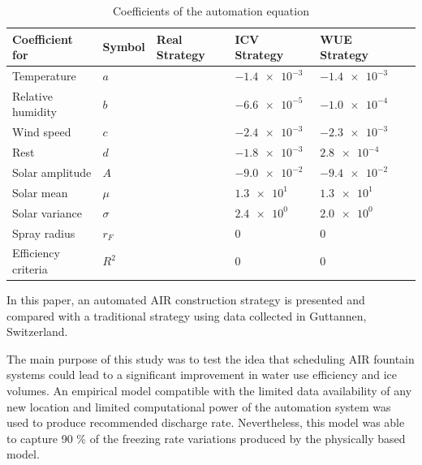 \documentclass[tc, manuscript]{copernicus}
\begin{document}
\begin{table}[]
\centering
\caption{Coefficients of the automation equation}
\label{tab:assumptions}
\begin{tabular}{@{}llllll@{}}
\toprule
\textbf{Coefficient for} & \textbf{Symbol} & \textbf{Real Strategy} & \textbf{ICV Strategy} & \textbf{WUE Strategy} & \\ \midrule
\multicolumn{1}{|l}{Temperature}       &$a$  & & $\num{-1.4 e-3}$ & $\num{-1.4 e-3}$ & \multicolumn{1}{l|}{} \\ \midrule
\multicolumn{1}{|l}{Relative humidity}      &$b$  & & $\num{-6.6 e-5}$ & $\num{-1.0 e-4}$ & \multicolumn{1}{l|}{} \\ \midrule
\multicolumn{1}{|l}{Wind speed}      &$c$  & & $\num{-2.4 e-3}$ & $\num{-2.3 e-3}$ & \multicolumn{1}{l|}{} \\ \midrule
\multicolumn{1}{|l}{Rest}      &$d$  & & $\num{-1.8 e-3}$ & $\num{2.8 e-4}$ & \multicolumn{1}{l|}{} \\ \midrule
\multicolumn{1}{|l}{Solar amplitude}      &$A$  & & $\num{-9.0 e-2}$ & $\num{-9.4 e-2}$ & \multicolumn{1}{l|}{} \\ \midrule
\multicolumn{1}{|l}{Solar mean}    &$\mu$  & & $\num{1.3 e+1}$  & $\num{1.3 e+1}$ & \multicolumn{1}{l|}{} \\ \midrule
\multicolumn{1}{|l}{Solar variance} &$\sigma$  & & $\num{2.4 e+0}$  & $\num{2.0 e+0}$ & \multicolumn{1}{l|}{} \\ \midrule
\multicolumn{1}{|l}{Spray radius} &$r_F$ & & 0 & 0 & \multicolumn{1}{l|}{} \\ \bottomrule
\multicolumn{1}{|l}{Efficiency criteria} &$R^2$ & & 0 & 0 & \multicolumn{1}{l|}{} \\ \bottomrule
\end{tabular}
\end{table}


\conclusions
In this paper, an automated AIR construction strategy is presented and compared with a traditional strategy
using data collected in Guttannen, Switzerland.

The main purpose of this study was to test the idea that scheduling AIR fountain systems could lead to a
significant improvement in water use efficiency and ice volumes. An empirical model compatible with the limited
data availability of any new location and limited computational power of the automation system was used to
produce recommended discharge rate. Nevertheless, this model was able to capture 90 \% of the freezing rate
variations produced by the physically based model.
\end{document}
